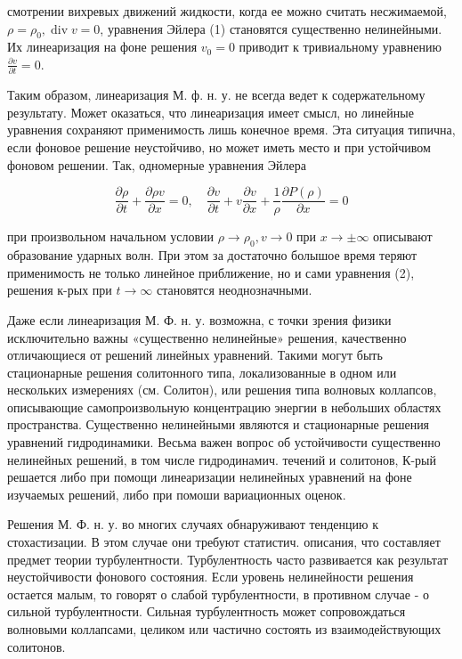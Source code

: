 \documentclass[10pt]{article}
\begin{document}
смотрении вихревых движений жидкости, когда ее можно считать несжимаемой, $\rho=\rho_{0}, \operatorname{div} v=0$, уравнения Эйлера (1) становятся существенно нелинейными. Их линеаризация на фоне решения $v_{0}=0$ приводит к тривиальному уравнению $\frac{\partial v}{\partial t}=0$.



Таким образом, линеаризация М. ф. н. у. не всегда ведет к содержательному результату. Может оказаться, что линеаризация имеет смысл, но линейные уравнения сохраняют применимость лишь конечное время. Эта ситуация типична, если фоновое решение неустойчиво, но может иметь место и при устойчивом фоновом решении. Так, одномерные уравнения Эйлера



\[

\frac{\partial \rho}{\partial t}+\frac{\partial \rho v}{\partial x}=0, \quad \frac{\partial v}{\partial t}+v \frac{\partial v}{\partial x}+\frac{1}{\rho} \frac{\partial P(\rho)}{\partial x}=0

\]



при произвольном начальном условии $\rho \rightarrow \rho_{0}, v \rightarrow 0$ при $x \rightarrow \pm \infty$ описывают образование ударных волн. При этом за достаточно болышое время теряют применимость не только линейное приближение, но и сами уравнения (2), решения к-рых при $t \rightarrow \infty$ становятся неоднозначными.



Даже если линеаризация М. Ф. н. у. возможна, с точки зрения физики исключительно важны «существенно нелинейные» решения, качественно отличающиеся от решений линейных уравнений. Такими могут быть стационарные решения солитонного типа, локализованные в одном или нескольких измерениях (см. Солитон), или решения типа волновых коллапсов, описывающие самопроизвольную концентрацию энергии в небольших областях пространства. Существенно нелинейными являются и стационарные решения уравнений гидродинамики. Весьма важен вопрос об устойчивости существенно нелинейных решений, в том числе гидродинамич. течений и солитонов, К-рый решается либо при помощи линеаризации нелинейных уравнений на фоне изучаемых решений, либо при помоши вариационных оценок.



Решения М. Ф. н. у. во многих случаях обнаруживают тенденцию к стохастизации. В этом случае они требуют статистич. описания, что составляет предмет теории турбулентности. Турбулентность часто развивается как результат неустойчивости фонового состояния. Если уровень нелинейности решения остается малым, то говорят о слабой турбулентности, в противном случае - о сильной турбулентности. Сильная турбулентность может сопровождаться волновыми коллапсами, целиком или частично состоять из взаимодействующих солитонов.
\end{document}
